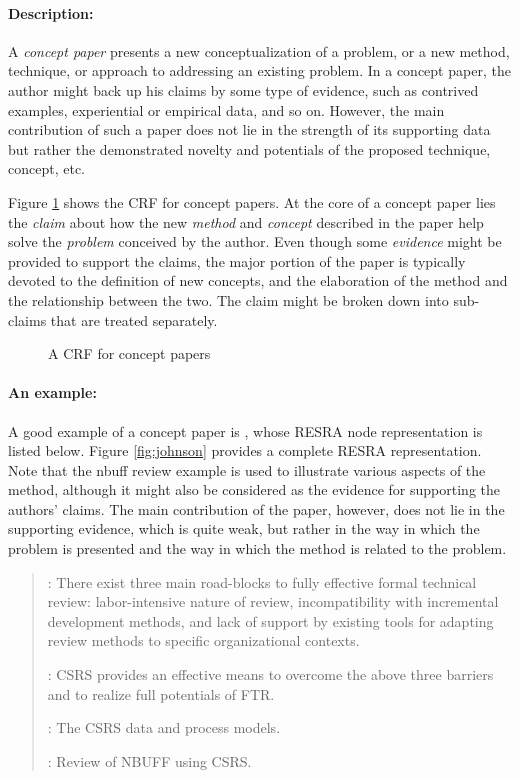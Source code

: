 \paragraph{Description:}

A {\it concept paper\/} presents a new conceptualization of a problem, or a
new method, technique, or approach to addressing an existing problem.  In a
concept paper, the author might back up his claims by some type of
evidence, such as contrived examples, experiential or empirical data, and
so on. However, the main contribution of such a paper does not lie in the
strength of its supporting data but rather the demonstrated novelty and
potentials of the proposed technique, concept, etc.

Figure \ref{fig:concept-crf} shows the CRF for concept papers. At the core
of a concept paper lies the {\it claim\/} about how the new {\it method\/}
and {\it concept\/} described in the paper help solve the {\it problem\/}
conceived by the author. Even though some {\it evidence\/} might be
provided to support the claims, the major portion of the paper is typically
devoted to the definition of new concepts, and the elaboration of the
method and the relationship between the two. The claim might be broken down
into sub-claims that are treated separately.

\begin{figure}[htb]
  \caption{A CRF for concept papers}
  \label{fig:concept-crf}
\end{figure}


\paragraph{An example:}

A good example of a concept paper is \cite{csdl-92-07}, whose RESRA node
representation is listed below. Figure \ref{fig:johnson} provides a
complete RESRA representation.  Note that the nbuff review example is used
to illustrate various aspects of the method, although it might also be
considered as the evidence for supporting the authors' claims.  The main
contribution of the paper, however, does not lie in the supporting
evidence, which is quite weak, but rather in the way in which the problem
is presented and the way in which the method is related to the problem.

\small
\begin{quotation}
  : There exist three main road-blocks to fully
  effective formal technical review: labor-intensive nature of review,
  incompatibility with incremental development methods, and lack of
  support by existing tools for adapting review methods to specific
  organizational contexts.
  
  : CSRS provides an effective means to overcome the
  above three barriers and to realize full potentials of FTR.
  
  : The CSRS data and process models.

  : Review of NBUFF using CSRS.
\end{quotation}
\normalsize

